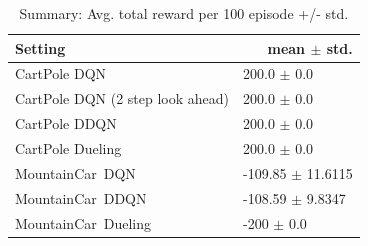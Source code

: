\documentclass[12pt]{article}
\begin{document}
    \begin{tcolorbox}[fit,height=22cm, width=\textwidth, blank, borderline={1pt}{-2pt},nobeforeafter]
        \begin{table}[H]
    	\centering
    	\caption{ Summary: Avg. total reward per 100 episode +/- std.}
    	\begin{tabular}{|p{9.43em}|r|}
    		\hline
    		\textbf{\small Setting} & \multicolumn{1}{p{10.645em}|}{\textbf{ \small mean $\pm$ std.}} \\
    		\hline
    		{\small CartPole DQN} & \multicolumn{1}{l|}{200.0 $\pm$ 0.0} \\
    		\hline
    		{\small CartPole DQN} \newline{} {\small(2 step look ahead)} & \multicolumn{1}{l|}{200.0 $\pm$ 0.0} \\
    		\hline
    		{\small CartPole DDQN} & \multicolumn{1}{l|}{200.0 $\pm$ 0.0} \\
    		\hline
    		{\small CartPole Dueling} & \multicolumn{1}{l|}{200.0 $\pm$ 0.0} \\
    		\hline
    		{\small MountainCar DQN} & \multicolumn{1}{l|}{-109.85 $\pm$ 11.6115} \\
    		\hline
    		{\small MountainCar DDQN} & \multicolumn{1}{l|}{-108.59 $\pm$ 9.8347} \\
    		\hline
    		{\small MountainCar Dueling} & \multicolumn{1}{l|}{-200 $\pm$ 0.0} \\
    		\hline
    	\end{tabular}%
    	\label{tab5}%
    \end{table}%
    \end{tcolorbox}
\end{document}
